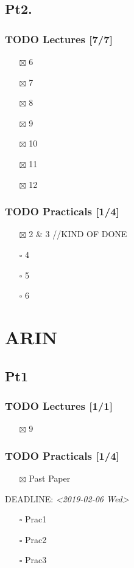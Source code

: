 \documentclass[11pt]{article}
\begin{document}
\subsection{Pt2.}
\label{sec:org2b05b49}
\subsubsection{{\bfseries\sffamily TODO} Lectures [7/7]}
\label{sec:org55a633a}
\begin{itemize}
\item[{$\boxtimes$}] 6
\item[{$\boxtimes$}] 7
\item[{$\boxtimes$}] 8
\item[{$\boxtimes$}] 9
\item[{$\boxtimes$}] 10
\item[{$\boxtimes$}] 11
\item[{$\boxtimes$}] 12
\end{itemize}

\subsubsection{{\bfseries\sffamily TODO} Practicals [1/4]}
\label{sec:orgebec67a}
\begin{itemize}
\item[{$\boxtimes$}] 2 \& 3 //KIND OF DONE
\item[{$\square$}] 4
\item[{$\square$}] 5
\item[{$\square$}] 6
\end{itemize}
\section{ARIN}
\label{sec:org48155f6}
\subsection{Pt1}
\label{sec:org1a633d6}
\subsubsection{{\bfseries\sffamily TODO} Lectures [1/1]}
\label{sec:orgf29b903}
\begin{itemize}
\item[{$\boxtimes$}] 9
\end{itemize}
\subsubsection{{\bfseries\sffamily TODO} Practicals [1/4]}
\label{sec:org1c236ad}
\begin{itemize}
\item[{$\boxtimes$}] Past Paper
\end{itemize}
DEADLINE: \textit{<2019-02-06 Wed>}
\begin{itemize}
\item[{$\square$}] Prac1
\item[{$\square$}] Prac2
\item[{$\square$}] Prac3
\end{itemize}
\end{document}
